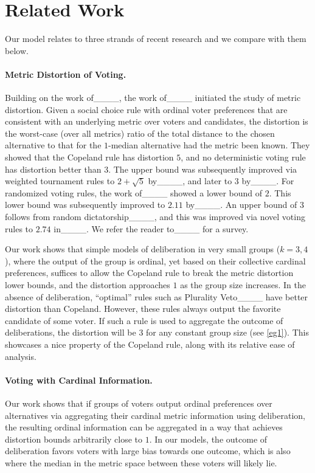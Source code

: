 \section{Related Work}
Our model relates to three strands of recent research and we compare with them below.

\paragraph{Metric Distortion of Voting.} Building on the work of____, the work of____ initiated the study of metric distortion. Given a social choice rule with ordinal voter preferences that are consistent with an underlying metric over voters and candidates, the distortion is the worst-case (over all metrics) ratio of the total distance to the chosen alternative to that for the $1$-median alternative had the metric been known. They showed that the Copeland rule has distortion $5$, and no deterministic voting rule has distortion better than $3$.  The upper bound was subsequently improved via weighted tournament rules to $2 + \sqrt{5}$ by____, and later to $3$ by____.  For randomized voting rules, the work of____ showed a lower bound of $2$. This lower bound was subsequently improved to $2.11$ by____. An upper bound of $3$ follows from random dictatorship____, and this was improved via novel voting rules to $2.74$ in____. We refer the reader to____ for a survey.

Our work shows that simple models of deliberation in very small groups ($k=3,4$), where the output of the group is ordinal, yet based on their collective cardinal preferences, suffices to allow the Copeland rule to break the metric distortion lower bounds, and the distortion approaches $1$ as the group size increases. In the absence of deliberation, ``optimal'' rules such as Plurality Veto____ have better distortion than Copeland. However, these rules always output the favorite candidate of some voter. If such a rule is used to aggregate the outcome of deliberations, the distortion will be $3$ for any constant group size (see \cref{eg1}). This showcases a nice property of the Copeland rule, along with its relative ease of analysis.

\paragraph{Voting with Cardinal Information.} Our work shows that if groups of voters output ordinal preferences over alternatives via aggregating their cardinal metric information using deliberation, the resulting ordinal information can be aggregated in a way that achieves distortion bounds arbitrarily close to $1$. In our models, the outcome of deliberation favors voters with large bias towards one outcome, which is also where the median in the metric space between these voters will likely lie. 

